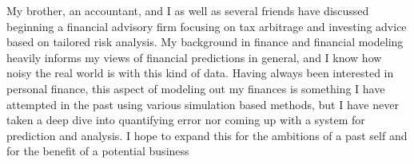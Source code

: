 \documentclass[11pt,a4paper]{article}
\begin{document}
My brother, an accountant, and I as well as several friends have discussed beginning a financial advisory firm focusing on tax arbitrage and investing advice based on tailored risk analysis. My background in finance and financial modeling heavily informs my views of financial predictions in general, and I know how noisy the real world is with this kind of data. Having always been interested in personal finance, this aspect of modeling out my finances is something I have attempted in the past using various simulation based methods, but I have never taken a deep dive into quantifying error nor coming up with a system for prediction and analysis. I hope to expand this for the ambitions of a past self and for the benefit of a potential business


%
%



%	
%	
%	
%	


%
\end{document}
